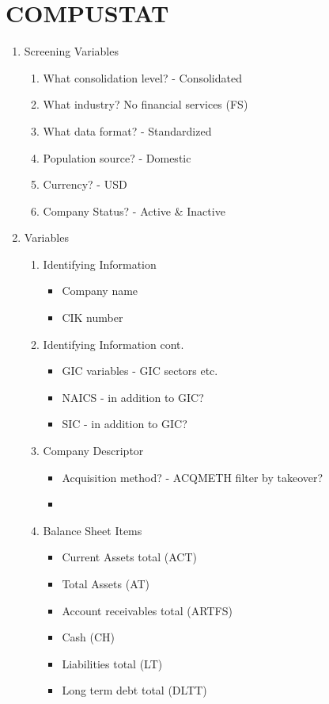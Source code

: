 \documentclass[12pt]{article}
\begin{document}
\section{COMPUSTAT}
\begin{enumerate}

    \item Screening Variables
   
    \begin{enumerate}
        \item What consolidation level? - Consolidated
        \item What industry? No financial services (FS) 
        \item What data format?  - Standardized 
        \item Population source? - Domestic 
        \item Currency? - USD 
        \item Company Status? - Active \& Inactive  
    \end{enumerate}
   
    \item Variables 
    
    \begin{enumerate}
        \item Identifying Information
        \begin{itemize}
            \item Company name 
            \item CIK number 
        \end{itemize}
    
        \item Identifying Information cont.  
        \begin{itemize}
            \item GIC variables - GIC sectors etc.
            \item NAICS - in addition to GIC? 
            \item SIC - in addition to GIC?
        \end{itemize}

        \item Company Descriptor
        \begin{itemize}
            \item Acquisition method? - ACQMETH filter by takeover? 
            \item 
        \end{itemize}
        
        \item Balance Sheet Items 
        \begin{itemize}
            \item Current Assets total (ACT)
            \item Total Assets (AT)
            \item Account receivables total (ARTFS)
            \item Cash (CH)
            \item Liabilities total (LT) 
            \item Long term debt total (DLTT)
        \end{itemize}
        

\end{enumerate}
\end{enumerate}
\end{document}
